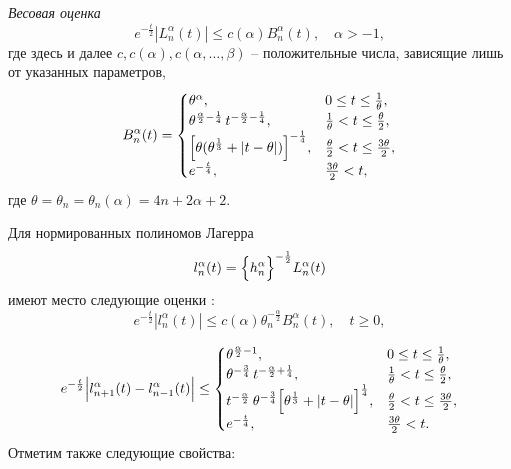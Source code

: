 \textit{Весовая оценка} \cite{sob-lag-sb-AskeyWaiger}
\begin{equation}\label{sob-lag-smj-2.10}
e^{-\frac{t}{2}}|L_n^\alpha(t)| \le c(\alpha) B_n^\alpha(t), \quad \alpha>-1,
\end{equation}
где здесь и далее $c,c(\alpha),c(\alpha,\ldots,\beta)$ -- положительные числа, зависящие лишь от указанных параметров,
\begin{equation*}\label{sob-lag-smj-2.11}
B_n^\alpha(t)=
\begin{cases}
\theta^\alpha, &0 \le t \le \frac{1}{\theta},\\
\theta^{\frac{\alpha}{2} - \frac{1}{4}}\,t^{-\frac{\alpha}{2} - \frac{1}{4}}, & \frac{1}{\theta} < t \le \frac{\theta}{2},\\
\Bigl[
\theta(\theta^{\frac{1}{3}}+|t-\theta|)
\Bigr]^{-\frac{1}{4}}, & \frac{\theta}{2} < t \le \frac{3\theta}{2},\\
e^{-\frac{t}{4}}, &\frac{3\theta}{2}< t,
\end{cases}
\end{equation*}
где $\theta=\theta_n=\theta_n(\alpha)=4n+2\alpha+2$.

Для нормированных полиномов Лагерра
\begin{equation}\label{sob-lag-smj-2.12}
l_n^\alpha(t)=
\Bigl\{h_n^\alpha \Bigr\}^{-\frac{1}{2}} L_n^\alpha(t)
\end{equation}
имеют место следующие оценки \cite{sob-lag-sb-AskeyWaiger}:
\begin{equation*}\label{sob-lag-smj-2.13}
e^{-\frac{t}{2}}
|l_n^\alpha(t)|\le
c(\alpha)\theta_n^{-\frac{\alpha}{2}}B_n^\alpha(t), \quad t \ge 0,
\end{equation*}

\begin{equation*}\label{sob-lag-smj-2.14}
e^{-\frac{t}{2}}
\Bigl|
l_{n+1}^\alpha(t)-
l_{n-1}^\alpha(t)
\Bigr|\le
\begin{cases}
\theta^{\frac{\alpha}{2}-1}, &0 \le t \le \frac{1}{\theta},\\
\theta^{-\frac{3}{4}}\,t^{-\frac{\alpha}{2} + \frac{1}{4}}, & \frac{1}{\theta} < t \le \frac{\theta}{2},\\
t^{-\frac{\alpha}{2}}\,
\theta^{-\frac{3}{4}}
\Bigl[
\theta^{\frac{1}{3}}+|t-\theta|
\Bigr]^{\frac{1}{4}}, & \frac{\theta}{2} < t \le \frac{3\theta}{2},\\
e^{-\frac{t}{4}}, &\frac{3\theta}{2}< t.
\end{cases}
\end{equation*}
Отметим также следующие свойства:

